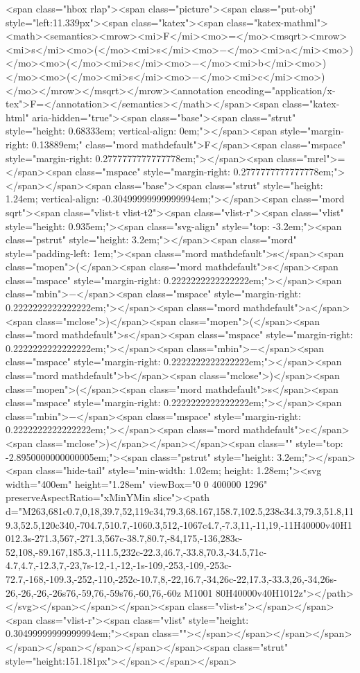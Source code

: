 <span class="hbox rlap"><span class="picture"><span class="put-obj" style="left:11.339px"><span class="katex"><span class="katex-mathml"><math><semantics><mrow><mi>F</mi><mo>=</mo><msqrt><mrow><mi>s</mi><mo>(</mo><mi>s</mi><mo>−</mo><mi>a</mi><mo>)</mo><mo>(</mo><mi>s</mi><mo>−</mo><mi>b</mi><mo>)</mo><mo>(</mo><mi>s</mi><mo>−</mo><mi>c</mi><mo>)</mo></mrow></msqrt></mrow><annotation encoding="application/x-tex">F=</annotation></semantics></math></span><span class="katex-html" aria-hidden="true"><span class="base"><span class="strut" style="height: 0.68333em; vertical-align: 0em;"></span><span style="margin-right: 0.13889em;" class="mord mathdefault">F</span><span class="mspace" style="margin-right: 0.2777777777777778em;"></span><span class="mrel">=</span><span class="mspace" style="margin-right: 0.2777777777777778em;"></span></span><span class="base"><span class="strut" style="height: 1.24em; vertical-align: -0.30499999999999994em;"></span><span class="mord sqrt"><span class="vlist-t vlist-t2"><span class="vlist-r"><span class="vlist" style="height: 0.935em;"><span class="svg-align" style="top: -3.2em;"><span class="pstrut" style="height: 3.2em;"></span><span class="mord" style="padding-left: 1em;"><span class="mord mathdefault">s</span><span class="mopen">(</span><span class="mord mathdefault">s</span><span class="mspace" style="margin-right: 0.2222222222222222em;"></span><span class="mbin">−</span><span class="mspace" style="margin-right: 0.2222222222222222em;"></span><span class="mord mathdefault">a</span><span class="mclose">)</span><span class="mopen">(</span><span class="mord mathdefault">s</span><span class="mspace" style="margin-right: 0.2222222222222222em;"></span><span class="mbin">−</span><span class="mspace" style="margin-right: 0.2222222222222222em;"></span><span class="mord mathdefault">b</span><span class="mclose">)</span><span class="mopen">(</span><span class="mord mathdefault">s</span><span class="mspace" style="margin-right: 0.2222222222222222em;"></span><span class="mbin">−</span><span class="mspace" style="margin-right: 0.2222222222222222em;"></span><span class="mord mathdefault">c</span><span class="mclose">)</span></span></span><span class="" style="top: -2.8950000000000005em;"><span class="pstrut" style="height: 3.2em;"></span><span class="hide-tail" style="min-width: 1.02em; height: 1.28em;"><svg width="400em" height="1.28em" viewBox="0 0 400000 1296" preserveAspectRatio="xMinYMin slice"><path d="M263,681c0.7,0,18,39.7,52,119c34,79.3,68.167,158.7,102.5,238c34.3,79.3,51.8,119.3,52.5,120c340,-704.7,510.7,-1060.3,512,-1067c4.7,-7.3,11,-11,19,-11H40000v40H1012.3s-271.3,567,-271.3,567c-38.7,80.7,-84,175,-136,283c-52,108,-89.167,185.3,-111.5,232c-22.3,46.7,-33.8,70.3,-34.5,71c-4.7,4.7,-12.3,7,-23,7s-12,-1,-12,-1s-109,-253,-109,-253c-72.7,-168,-109.3,-252,-110,-252c-10.7,8,-22,16.7,-34,26c-22,17.3,-33.3,26,-34,26s-26,-26,-26,-26s76,-59,76,-59s76,-60,76,-60z M1001 80H40000v40H1012z"></path></svg></span></span></span><span class="vlist-s">​</span></span><span class="vlist-r"><span class="vlist" style="height: 0.30499999999999994em;"><span class=""></span></span></span></span></span></span></span></span></span><span class="strut" style="height:151.181px"></span></span></span>
